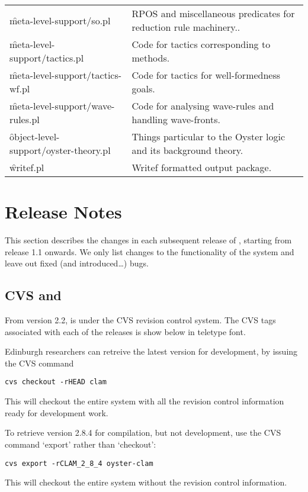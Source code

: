 {\begin{supertabular}{@{}lp{.5\textwidth}@{}}
\f{meta-level-support/so.pl}    
                        & RPOS and miscellaneous predicates for 
                        reduction rule machinery..\\
\f{meta-level-support/tactics.pl}       
                        & Code for tactics corresponding to methods.\\
\f{meta-level-support/tactics-wf.pl}    
                        & Code for tactics for well-formedness goals.\\
\f{meta-level-support/wave-rules.pl}    
                        & Code for analysing wave-rules and handling wave-fronts.\\
\f{object-level-support/oyster-theory.pl}       
                        & Things particular to the Oyster logic and
                           its  background theory.\\ 
\f{writef.pl}           & Writef formatted output package.\\
\end{supertabular}}


\section {Release Notes}
\label{release-notes}

This section describes the changes in each subsequent release of
\clam, starting from release 1.1 onwards. We only list changes to the
functionality of the system and leave out fixed (and introduced\ldots)
bugs. 

\subsection {CVS and \clam}
\label{app:cvs-clam}
From version 2.2, \clam is under the CVS revision control system.  The
CVS tags associated with each of the releases is show below in
teletype font.

Edinburgh researchers can retreive the latest \clam version for
development, by issuing the CVS command
\begin{verbatim}
cvs checkout -rHEAD clam
\end{verbatim}
This will checkout the entire \clam system with all the revision
control information ready for development work.

To retrieve \clam version 2.8.4 for compilation, but not development,
use the CVS command `export' rather than `checkout':
\begin{verbatim}
cvs export -rCLAM_2_8_4 oyster-clam
\end{verbatim}
This will checkout the entire \clam system without the revision
control information.

